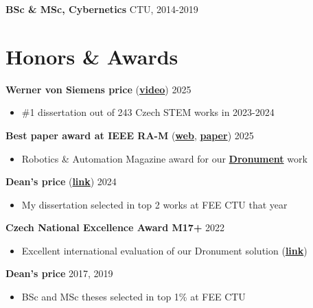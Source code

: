 \documentclass[12pt,a4paper]{article}
\newcommand\Colorhreff[3][reff]{\href{#2}{\color{#1}#3}}
\begin{document}
\begin{paracol}{2}
\vspace{0.2cm}
\noindent
\textbf{BSc \& MSc, Cybernetics} \hfill CTU, 2014-2019

\section*{Honors \& Awards}
\textbf{Werner von Siemens price} (\Colorhreff{https://www.youtube.com/watch?v=idnDA4Ap-J4}{\textbf{video}}) \hfill 2025
\begin{itemize}
  \item \#1 dissertation out of 243 Czech STEM works in 2023-2024
\end{itemize}

\vspace{0.2cm}
\noindent
\textbf{Best paper award at IEEE RA-M} (\Colorhreff{https://www.linkedin.com/posts/mrsgroupprague_icra2025-robotics-dronetechnology-activity-7332784284316962816-kg45}{\textbf{web}}, \Colorhreff{https://mrs.fel.cvut.cz/data/papers/petracek2023ram.pdf}{\textbf{paper}}) \hfill 2025
\begin{itemize}
  \item Robotics \& Automation Magazine award for our \Colorhreff{https://www.youtube.com/watch?v=Gx-mBklSbYc}{\textbf{Dronument}} work
\end{itemize}

\vspace{0.2cm}
\noindent
\textbf{Dean's price} (\Colorhreff{https://cyber.felk.cvut.cz/news/pavel-petracek-received-the-deans-award-for-prestigious-dissertation/}{\textbf{link}}) \hfill 2024
\begin{itemize}
  \item My dissertation selected in top 2 works at FEE CTU that year
\end{itemize}

\vspace{0.2cm}
\noindent
\textbf{Czech National Excellence Award M17+} \hfill 2022
\begin{itemize}
  \item Excellent international evaluation of our Dronument solution (\Colorhreff{https://mrs.fel.cvut.cz/dg18p02ovv069-fvz}{\textbf{link}})
\end{itemize}

\vspace{0.2cm}
\noindent
\textbf{Dean's price} \hfill 2017, 2019
\begin{itemize}
  \item BSc and MSc theses selected in top 1\% at FEE CTU
\end{itemize}

\end{paracol}
\end{document}
